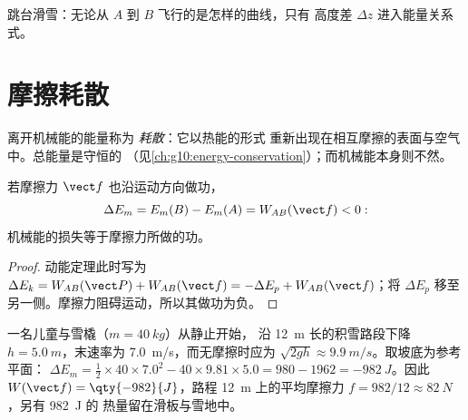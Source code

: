 \begin{omfigure}

{\small 跳台滑雪：无论从 $A$ 到 $B$ 飞行的是怎样的曲线，只有
高度差 $\Delta z$ 进入能量关系式。}
\end{omfigure}

\section{摩擦耗散}

\begin{definition}[耗散]\label{def:g11:mechanical-energy:dissipation}
离开机械能的能量称为
\emph{耗散}：它以热能的形式
重新出现在相互摩擦的表面与空气中。总能量是守恒的
（见\cref{ch:g10:energy-conservation}）；而机械能本身则不然。
\end{definition}

\begin{proposition}[亏损量衡量摩擦力]\label{prop:g11:mechanical-energy:deficit}
若摩擦力 $\vect f$ 也沿运动方向做功，
\[
\Delta E_m = E_m(B) - E_m(A) = W_{AB}(\vect f) < 0:
\]
机械能的损失等于摩擦力所做的功。
\end{proposition}

\begin{proof}
动能定理此时写为 $\Delta E_k = W_{AB}(\vect P) +
W_{AB}(\vect f) = -\Delta E_p + W_{AB}(\vect f)$；将 $\Delta E_p$
移至另一侧。摩擦力阻碍运动，所以其做功为负。
\end{proof}

\begin{example}[雪橇能量核算]\label{ex:g11:mechanical-energy:toboggan}
一名儿童与雪橇（$m = \qty{40}{kg}$）从静止开始，
沿 \qty{12}{m} 长的积雪路段下降 $h = \qty{5.0}{m}$，末速率为
\qty{7.0}{m/s}，而无摩擦时应为
$\sqrt{2gh} \approx \qty{9.9}{m/s}$。取坡底为参考平面：
$\Delta E_m = \tfrac12 \times 40 \times 7.0^2 - 40 \times 9.81
\times 5.0 = 980 - 1962 = \qty{-982}{J}$。因此 $W(\vect f) =
\qty{-982}{J}$，路程 \qty{12}{m} 上的平均摩擦力
$f = 982/12 \approx \qty{82}{N}$，另有 \qty{982}{J} 的
热量留在滑板与雪地中。
\end{example}

